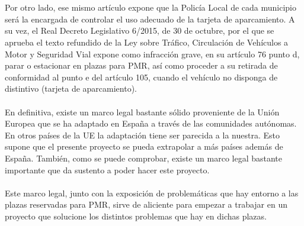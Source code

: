 \\\\
Por otro lado, ese mismo artículo expone que la Policía Local de cada municipio será la encargada de controlar el uso adecuado de la tarjeta de aparcamiento. A su vez, el Real Decreto Legislativo 6/2015, de 30 de octubre, por el que se aprueba el texto refundido de la Ley sobre Tráfico, Circulación de Vehículos a Motor y Seguridad Vial \cite{rdl6-2015} expone como infracción grave, en su artículo 76 punto d, parar o estacionar en plazas para PMR, así como proceder a su retirada de conformidad al punto e del artículo 105, cuando el vehículo no disponga de distintivo (tarjeta de aparcamiento).
\\\\
En definitiva, existe un marco legal bastante sólido proveniente de la Unión Europea que se ha adaptado en España a través de las comunidades autónomas. En otros países de la UE la adaptación tiene ser parecida a la nuestra. Esto supone que el presente proyecto se pueda extrapolar a más países además de España. También, como se puede comprobar, existe un marco legal bastante importante que da sustento a poder hacer este proyecto.
\\\\
Este marco legal, junto con la exposición de problemáticas que hay entorno a las plazas reservadas para PMR, sirve de aliciente para empezar a trabajar en un proyecto que solucione los distintos problemas que hay en dichas plazas.